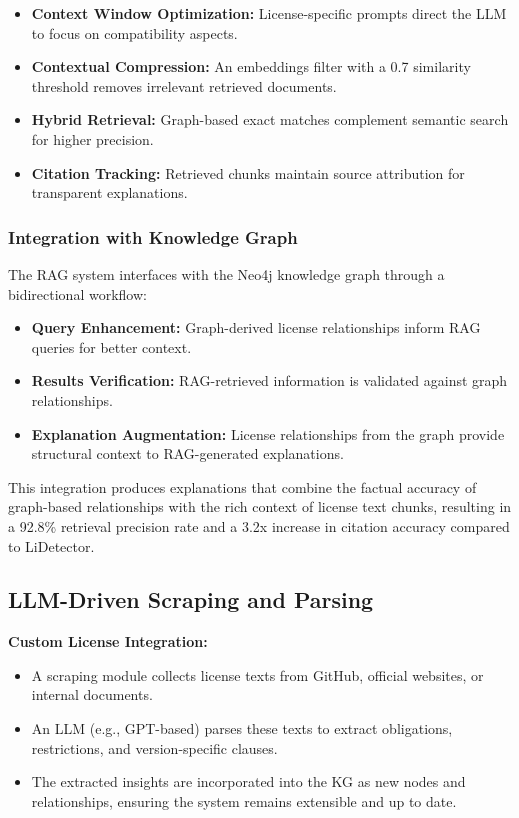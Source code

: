 \documentclass[9pt,twocolumn]{article}
\begin{document}
\begin{itemize}
    \item \textbf{Context Window Optimization:} License-specific prompts direct the LLM to focus on compatibility aspects.
    \item \textbf{Contextual Compression:} An embeddings filter with a 0.7 similarity threshold removes irrelevant retrieved documents.
    \item \textbf{Hybrid Retrieval:} Graph-based exact matches complement semantic search for higher precision.
    \item \textbf{Citation Tracking:} Retrieved chunks maintain source attribution for transparent explanations.
\end{itemize}

\subsubsection{Integration with Knowledge Graph}
The RAG system interfaces with the Neo4j knowledge graph through a bidirectional workflow:

\begin{itemize}
    \item \textbf{Query Enhancement:} Graph-derived license relationships inform RAG queries for better context.
    \item \textbf{Results Verification:} RAG-retrieved information is validated against graph relationships.
    \item \textbf{Explanation Augmentation:} License relationships from the graph provide structural context to RAG-generated explanations.
\end{itemize}

This integration produces explanations that combine the factual accuracy of graph-based relationships with the rich context of license text chunks, resulting in a 92.8\% retrieval precision rate and a 3.2x increase in citation accuracy compared to LiDetector.

\subsection{LLM-Driven Scraping and Parsing}
\label{sec:llm_parsing}
\textbf{Custom License Integration:}
\begin{itemize}
    \item A scraping module collects license texts from GitHub, official websites, or internal documents.
    \item An LLM (e.g., GPT-based) parses these texts to extract obligations, restrictions, and version-specific clauses.
    \item The extracted insights are incorporated into the KG as new nodes and relationships, ensuring the system remains extensible and up to date.
\end{itemize}
\end{document}
